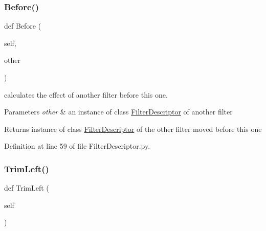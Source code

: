 \subsubsection{\texorpdfstring{Before()}{Before()}}
{\footnotesize\ttfamily def Before (\begin{DoxyParamCaption}\item[{}]{self,  }\item[{}]{other }\end{DoxyParamCaption})}



calculates the effect of another filter before this one. 


\begin{DoxyParams}{Parameters}
{\em other} & an instance of class \hyperlink{classSignalIntegrity_1_1TimeDomain_1_1Filters_1_1FilterDescriptor_1_1FilterDescriptor}{Filter\+Descriptor} of another filter \\
\hline
\end{DoxyParams}
\begin{DoxyReturn}{Returns}
instance of class \hyperlink{classSignalIntegrity_1_1TimeDomain_1_1Filters_1_1FilterDescriptor_1_1FilterDescriptor}{Filter\+Descriptor} of the other filter moved before this one 
\end{DoxyReturn}


Definition at line 59 of file Filter\+Descriptor.\+py.

\mbox{\label{classSignalIntegrity_1_1TimeDomain_1_1Filters_1_1FilterDescriptor_1_1FilterDescriptor_aa755b1fade9a131f66c5a448181a158e}} 
\subsubsection{\texorpdfstring{Trim\+Left()}{TrimLeft()}}
{\footnotesize\ttfamily def Trim\+Left (\begin{DoxyParamCaption}\item[{}]{self }\end{DoxyParamCaption})}



